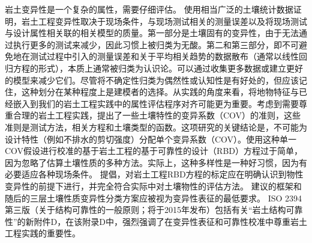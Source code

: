 \begin{Parallel}{0.60\textwidth}{}
{    }
    \ParallelRText
    {
        岩土变异性是一个复杂的属性，需要仔细评估。 \citet{Phoon1999612}使用相当广泛的土壤统计数据证明，岩土工程变异性取决于现场条件，与现场测试相关的测量误差以及将现场测试与设计属性相关联的相关模型的质量。第一部分是土壤固有的变异性，由于无法通过执行更多的测试来减少，因此习惯上被归类为无酸。第二和第三部分，即不可避免地在测试过程中引入的测量误差和关于平均相关趋势的数据散布（通常以线性回归方程的形式），本质上通常被归类为认识论。可以通过收集更多数据或建立更好的模型来减少它们。尽管将不确定性归类为偶然性或认知性是有好处的，但应该记住，这种划分在某种程度上是建模者的选择\citep{DerKiureghian2007}。从实践的角度来看，将地物特征与已经嵌入到我们的岩土工程实践中的属性评估程序对齐可能更为重要。考虑到需要尊重合理的岩土工程实践，\citet{Phoon1999625}提出了一些土壤特性的变异系数（COV）的准则，这些准则是测试方法，相关方程和土壤类型的函数。这项研究的关键结论是，不可能为设计特性（例如不排水的剪切强度）分配单个变异系数（COV）。使用这种单一COV假设进行校准的基于岩土工程的基于可靠性的设计（RBD）方程过于简单，因为忽略了估算土壤性质的多种方法。实际上，这种多样性是一种好习惯，因为有必要适应各种现场条件。 \citet{Phoon1999612,Phoon1999625}提倡，对岩土工程RBD方程的标定应在明确认识到物性变异性的前提下进行，并完全符合实际中对土壤物性的评估方法。 \citet{Phoon1999612,Phoon1999625}建议的框架和随后的三层土壤性质变异性分类方案\citep{Phoon2008344}应被视为变异性表征的最低要求。 ISO 2394第三版（关于结构可靠性的一般原则；将于2015年发布）包括有关“岩土结构可靠性”的新附件D，在该附录D中，强烈强调了在变异性表征和可靠性校准中尊重岩土工程实践的重要性。
    }
    \ParallelPar
    \ParallelLText
    {
}
\end{Parallel}
